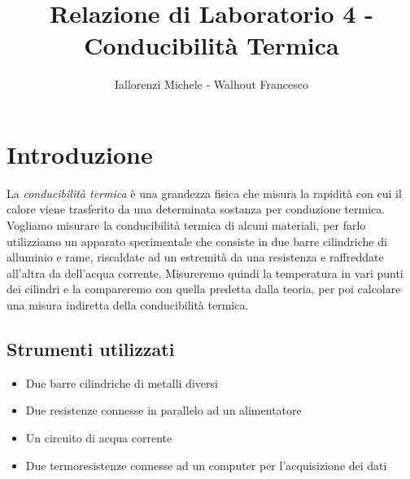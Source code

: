 \documentclass{article}
\title{Relazione di Laboratorio 4 - Conducibilità Termica}
\author{Iallorenzi Michele - Walhout Francesco}
\begin{document}
    \maketitle

    \section{Introduzione}
    La \emph{conducibilità termica} è una grandezza fisica che misura la
    rapidità con cui il calore viene trasferito da una determinata sostanza per
    conduzione termica.\\
    Vogliamo misurare la conducibilità termica di alcuni materiali,
    per farlo utilizziamo un apparato sperimentale che consiste in due barre cilindriche
    di alluminio e rame, riscaldate ad un estremità da una resistenza e raffreddate 
    all'altra da dell'acqua corrente.
    Misureremo quindi la temperatura in vari punti dei cilindri e la compareremo con
    quella predetta dalla teoria, per poi calcolare una misura indiretta della 
    conducibilità termica.\\
    \subsection{Strumenti utilizzati}
    \begin{itemize}
        \item Due barre cilindriche di metalli diversi
        \item Due resistenze connesse in parallelo ad un alimentatore
        \item Un circuito di acqua corrente
        \item Due termoresistenze connesse ad un computer per l'acquisizione dei dati
    \end{itemize}
\end{document}
